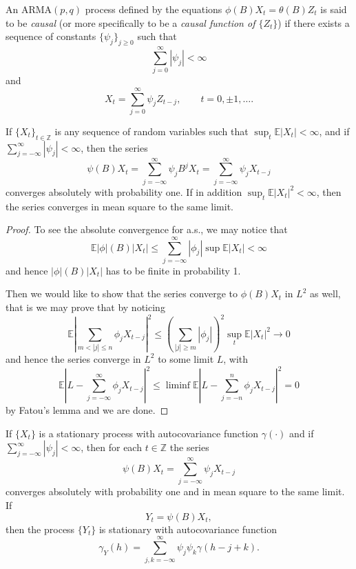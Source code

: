 \begin{definition}[Causality]
An ARMA$(p,q)$ process defined by the equations
$\phi(B)X_t=\theta(B)Z_t$ is said to be \emph{causal}
(or more specifically to be a \emph{causal function of $\{Z_t\}$})
if there exists a sequence of constants $\{\psi_j\}_{j\geq0}$ such that
\[
\sum_{j=0}^{\infty}|\psi_j|<\infty
\]
and
\[
X_t=\sum_{j=0}^{\infty}\psi_j Z_{t-j},
\qquad t=0,\pm1,\ldots.
\]
\end{definition}

\begin{proposition}
\label{thm: exist-sum-stationary}
If $\{X_t\}_{t\in\mathbb{Z}}$ is any sequence of random variables such that
$\sup_t\mathbb{E}|X_t|<\infty$, and if
$\sum_{j=-\infty}^{\infty}|\psi_j|<\infty$, then the series
\[
\psi(B)X_t
=\sum_{j=-\infty}^{\infty}\psi_j B^jX_t
=\sum_{j=-\infty}^{\infty}\psi_j X_{t-j}
\]
converges absolutely with probability one. If in addition
$\sup_t\mathbb{E}|X_t|^2<\infty$, then the series converges in mean square
to the same limit.
\end{proposition}
\begin{proof}
    To see the absolute convergence for a.s., we may notice that
    \[
    \mathbb{E} |\phi|(B)|X_t| \leq \sum\limits_{j=-\infty}^{\infty}|\phi_j|\sup\mathbb{E}|X_t| < \infty
    \]
    and hence $|\phi|(B)|X_t|$ has to be finite in probability 1.\par
    Then we would like to show that the series converge to $\phi(B)X_t$ in $L^2$ as well, that is we may prove that by noticing
    \[
    \mathbb{E}\left|\sum\limits_{m < |j| \leq n} \phi_j X_{t-j}\right|^2 \leq \left(\sum\limits_{|j|\geq m} |\phi_j|\right)^2\sup_{t}\mathbb{E}|X_t|^2 \to 0
    \]
    and hence the series converge in $L^2$ to some limit $L$, with
    \[
    \mathbb{E}|L-\sum\limits_{j = -\infty}^{\infty} \phi_jX_{t-j}|^2 \leq \liminf\mathbb{E}|L - \sum\limits_{j=-n}^n \phi_j X_{t-j}|^2 = 0
    \]
    by Fatou's lemma and we are done.
\end{proof}

\begin{proposition}
\label{thm: sum-stationary}
If $\{X_t\}$ is a stationary process with autocovariance function
$\gamma(\cdot)$ and if $\sum_{j=-\infty}^{\infty}|\psi_j|<\infty$,
then for each $t\in\mathbb{Z}$ the series
\[
\psi(B)X_t=\sum_{j=-\infty}^{\infty}\psi_jX_{t-j}
\]
converges absolutely with probability one and in mean square to the same
limit. If
\[
Y_t=\psi(B)X_t,
\]
then the process $\{Y_t\}$ is stationary with autocovariance function
\[
\gamma_Y(h)=\sum_{j,k=-\infty}^{\infty}
\psi_j\psi_k\gamma(h-j+k).
\]
\end{proposition}

